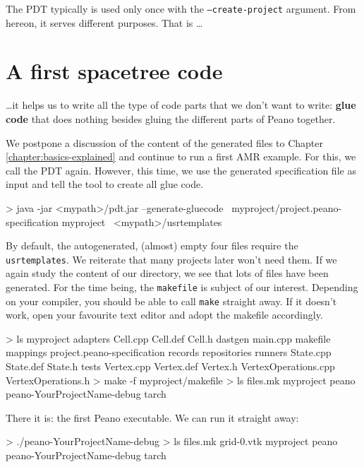 \noindent
The PDT typically is used only once with the \texttt{--create-project} argument.
From hereon, it serves different purposes. 
That is \ldots




\section{A first spacetree code}

\ldots it helps us to write all the type of code parts that we don't want to
write: {\bf glue code} that does nothing besides gluing the different parts of
Peano together.

We postpone a discussion of the content of the generated files to Chapter
\ref{chapter:basics-explained} and continue to run a first AMR example.
For this, we call the PDT again.
However, this time, we use the generated specification file as input and tell
the tool to create all glue code.


\begin{code}
> java -jar <mypath>/pdt.jar --generate-gluecode \
  myproject/project.peano-specification myproject \
  <mypath>/usrtemplates
\end{code}

\noindent
By default, the autogenerated, (almost) empty four files require the
\texttt{usrtemplates}.
We reiterate that many projects later won't need them.
If we again study the content of our directory, we see that lots of files have
been generated.
For the time being, the \texttt{makefile} is subject of our interest.
Depending on your compiler, you should be able to call \texttt{make} straight
away. 
If it doesn't work, open your favourite text editor and adopt the makefile
accordingly.
\begin{code}
> ls myproject
  adapters   Cell.cpp              Cell.def      
  Cell.h     dastgen               main.cpp     
  makefile   mappings              project.peano-specification  
  records    repositories          runners 
  State.cpp  State.def             State.h
  tests      Vertex.cpp            Vertex.def    
  Vertex.h   VertexOperations.cpp  VertexOperations.h
> make -f myproject/makefile
> ls
  files.mk  myproject  peano  peano-YourProjectName-debug  tarch
\end{code}


\noindent
There it is: the first Peano executable. We can run it straight away:
\begin{code}
> ./peano-YourProjectName-debug
> ls
  files.mk                     grid-0.vtk  myproject  peano  
  peano-YourProjectName-debug  tarch
\end{code}

